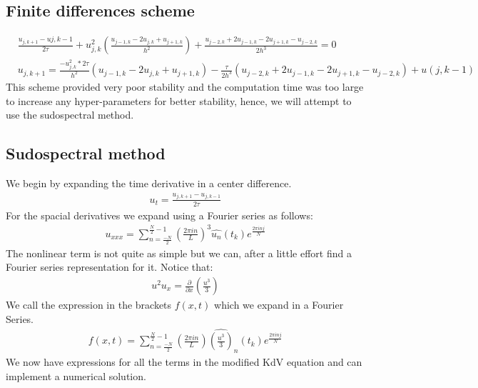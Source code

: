\documentclass{article}
\begin{document}
\subsection{Finite differences scheme}
\begin{align*}
&\frac{u_{j,k+1}-u{j,k-1}}{2\tau} + u^2_{j,k}\left(\frac{u_{j-1,k}-2u_{j,k}+u_{j+1,k}}{h^2} \right) + \frac{u_{j-2,k} + 2u_{j-1,k} - 2u_{j+1,k} -u_{j-2,k}}{2h^3} = 0 \\
&u_{j,k+1} = \frac{-u^2_{j,k}*2\tau}{h^2}\left(u_{j-1,k}-2u_{j,k}+u_{j+1,k} \right) - \frac{\tau}{2h^3}\left(u_{j-2,k} + 2u_{j-1,k} - 2u_{j+1,k} -u_{j-2,k} \right) + u(j,k-1)
\end{align*}
This scheme provided very poor stability and the computation time was too large to increase any hyper-parameters for better stability, hence, we will attempt to use the sudospectral method. 

\subsection{Sudospectral method}
We begin by expanding the time derivative in a center difference.
\begin{align*}
u_t = \frac{u_{j,k+1}-u_{j,k-1}}{2\tau}
\end{align*}
For the spacial derivatives we expand using a Fourier series as follows:
\begin{align*}
u_{xxx} = \sum_{n=\frac{-N}{2}}^{\frac{N}{2}-1}\left(\frac{2\pi i n}{L}\right)^3 \widehat{u_n}(t_k)e^{\frac{2\pi i n j}{N}}
\end{align*}
The nonlinear term is not quite as simple but we can, after a little effort find a Fourier series representation for it. Notice that:
\begin{align*}
u^2u_x = \frac{\partial}{\partial x}\left(\frac{u^3}{3}\right)
\end{align*}
We call the expression in the brackets $f(x,t)$ which we expand in a Fourier Series.
\begin{align*}
f(x,t) = \sum_{n=\frac{-N}{2}}^{\frac{N}{2}-1}\left(\frac{2\pi i n}{L}\right) \widehat{\left(\frac{u^3}{3}\right)}_n(t_k)e^{\frac{2\pi i n j}{N}}
\end{align*}
We now have expressions for all the terms in the modified KdV equation and can implement a numerical solution. 
\end{document}
